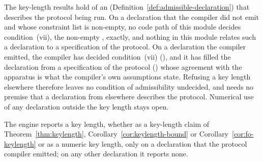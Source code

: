 
The key-length results hold of an 
(Definition~\ref{def:admissible-declaration}) that describes the protocol
being run. On a declaration that the compiler did not emit and whose
constraint list is non-empty, no code path of this module decides
condition~(vii), the non-empty , exactly, and nothing in this
module relates such a declaration to a specification of the protocol. On a
declaration the compiler emitted, the compiler has decided condition~(vii)
(), and it has filled the declaration
from a specification of the protocol () whose
agreement with the apparatus is what the compiler's own assumptions state.
Refusing a key length elsewhere therefore leaves no condition of
admissibility undecided, and needs no premise that a declaration from
elsewhere describes the protocol. Numerical use of any declaration outside
the key length stays open.

\begin{requirement}\label{req:compiled-declaration-only}
The engine reports a key length, whether as a key-length claim of
Theorem~\ref{thm:keylength}, Corollary~\ref{cor:keylength-bound} or
Corollary~\ref{cor:fo-keylength} or as a numeric key length, only on a
declaration that the protocol compiler emitted; on any other declaration it
reports none.
\end{requirement}
